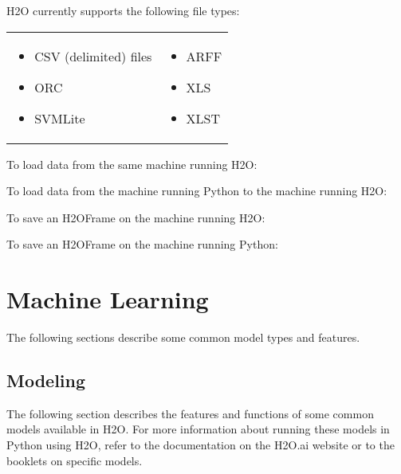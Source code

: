 {\newpage

 H2O currently supports the following file types:

\begin{frame}%

\begin{tabular}{p{5.5cm}p{5.5cm}}

\begin{itemize}
\item CSV (delimited) files
\item ORC
\item SVMLite
\end{itemize} &

\begin{itemize}
\item ARFF
\item XLS
\item XLST 
\end{itemize}

\end{tabular}
\end{frame}


To load data from the same machine running H2O:


To load data from the machine running Python to the machine running H2O:


To save an H2OFrame on the machine running H2O:


To save an H2OFrame on the machine running Python:


\section{Machine Learning}

The following sections describe some common model types and features. 


\subsection{Modeling}
The following section describes the features and functions of some common models available in H2O.  For more information about running these models in Python using H2O, refer to the documentation on
the H2O.ai website or to the booklets on specific models.


}
